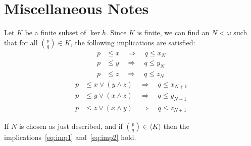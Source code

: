 \section{Miscellaneous Notes}
\noindent Let $K$ be a finite subset of $\ker h$.  Since $K$ is finite, we can find an $N < \omega$ such that for all $\binom{p}{q} \in K$, the following implications are satisfied:
\begin{align}
p &\leqslant x \quad \Longrightarrow \quad q \leqslant x_N\nonumber\\
p &\leqslant y \quad \Longrightarrow \quad q \leqslant y_N\label{eq:imp1}\\
p &\leqslant z \quad \Longrightarrow \quad q \leqslant z_N\nonumber
\end{align}
\begin{align}
p &\leqslant x \vee (y \wedge z) \quad \Longrightarrow \quad q \leqslant x_{N+1}\nonumber\\
p &\leqslant y \vee (x \wedge z) \quad \Longrightarrow \quad q \leqslant y_{N+1}\label{eq:imp2}\\
p &\leqslant z \vee (x \wedge y) \quad \Longrightarrow \quad q \leqslant z_{N+1}\nonumber
\end{align}

\medskip

 If $N$ is chosen as just described, and if $\binom{p}{q} \in \langle K \rangle$ then the implications~\ref{eq:imp1} and~\ref{eq:imp2} hold.

